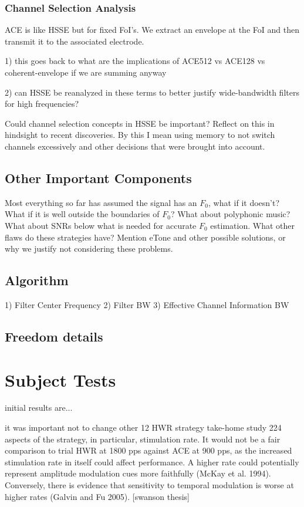 \documentclass [11pt, proquest] {uwthesis}[2015/03/03]
\begin{document}
\subsection{Channel Selection Analysis}

ACE is like HSSE but for fixed FoI's.  We extract an envelope at the FoI and then transmit it to the associated electrode.

1) this goes back to what are the implications of ACE512 vs ACE128 vs coherent-envelope if we are summing anyway

2) can HSSE be reanalyzed in these terms to better justify wide-bandwidth filters for high frequencies?

Could channel selection concepts in HSSE be important?  Reflect on this in hindsight to recent discoveries.  By this I mean using memory to not switch channels excessively and other decisions that were brought into account.

\section{Other Important Components}

Most everything so far has assumed the signal has an $F_0$, what if it doesn't?  What if it is well outside the boundaries of $F_0$?  What about polyphonic music?  What about SNRs below what is needed for accurate $F_0$ estimation.  What other flaws do these strategies have?  Mention eTone and other possible solutions, or why we justify not considering these problems.

\section{Algorithm}

1) Filter Center Frequency
2) Filter BW
3) Effective Channel Information BW

\section{Freedom details}


\chapter{Subject Tests}
initial results are...



 it was important not to change other
12 HWR strategy take-home study 224
aspects of the strategy, in particular, stimulation rate. It would not be a fair comparison to trial HWR at 1800 pps against ACE at 900 pps, as the increased stimulation rate in itself could affect performance. A higher rate could potentially represent amplitude modulation cues more faithfully (McKay et al. 1994). Conversely, there is evidence that sensitivity to temporal modulation is worse at higher rates (Galvin and Fu 2005).
[swanson thesis]
\end{document}
